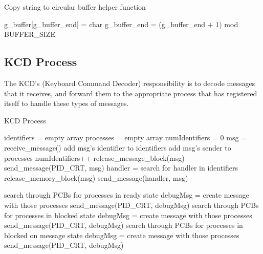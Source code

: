\documentclass[12pt]{report}
\begin{document}
\begin{algorithm}[H]
	\caption{Copy string to circular buffer helper function}
	\begin{algorithmic}[1]
	      \State g_buffer[g_buffer_end] = char
	      \State g_buffer_end = (g_buffer_end + 1) mod BUFFER_SIZE
	    \EndFor
	  \EndFunction
	\end{algorithmic}
\end{algorithm}

\subsection{KCD Process}

The KCD's (Keyboard Command Decoder) responsibility is to decode messages that it receives, and forward them to the appropriate process that has registered itself to handle these types of messages.

\begin{algorithm}[H]
	\caption{KCD Process}
	\begin{algorithmic}[1]
	    \State identifiers = empty array
	    \State processes = empty array
	    \State numIdentifiers = 0
	      \State msg = receive\_message()
	        \State add msg's identifier to identifiers
	        \State add msg's sender to processes
	        \State numIdentifiers++
	        \State release\_message\_block(msg)
	        \State send\_message(PID\_CRT, msg)
	      \Else
	          \State handler = search for handler in identifiers
	        \EndIf
	          \State release\_memory\_block(msg)
	        \Else
	          \State send\_message(handler, msg)
	        \EndIf

	          \State search through PCBs for processes in ready state
	          \State debugMsg = create message with those processes
	          \State send\_message(PID\_CRT, debugMsg)
	          \State search through PCBs for processes in blocked state
	          \State debugMsg = create message with those processes
	          \State send\_message(PID\_CRT, debugMsg)
	          \State search through PCBs for processes in blocked on message state
	          \State debugMsg = create message with those processes
	          \State send\_message(PID\_CRT, debugMsg)
	        \EndIf
	      \EndIf
	    \EndWhile
	  \EndFunction
	\end{algorithmic}
\end{algorithm}
\end{document}
